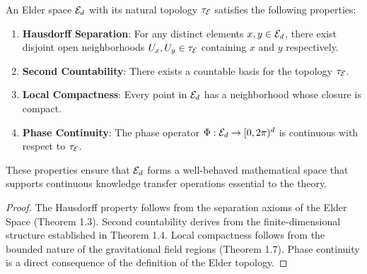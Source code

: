 \begin{theorem}
An Elder space $\mathcal{E}_{d}$ with its natural topology $\tau_{\mathcal{E}_{}}$ satisfies the following properties:
\begin{enumerate}
    \item \textbf{Hausdorff Separation}: For any distinct elements $x, y \in \mathcal{E}_{d}$, there exist disjoint open neighborhoods $U_x, U_y \in \tau_{\mathcal{E}_{}}$ containing $x$ and $y$ respectively.
    
    \item \textbf{Second Countability}: There exists a countable basis for the topology $\tau_{\mathcal{E}_{}}$.
    
    \item \textbf{Local Compactness}: Every point in $\mathcal{E}_{d}$ has a neighborhood whose closure is compact.
    
    \item \textbf{Phase Continuity}: The phase operator $\Phi: \mathcal{E}_{d} \rightarrow [0, 2\pi)^d$ is continuous with respect to $\tau_{\mathcal{E}_{}}$.
\end{enumerate}
These properties ensure that $\mathcal{E}_{d}$ forms a well-behaved mathematical space that supports continuous knowledge transfer operations essential to the theory.
\end{theorem}

\begin{proof}
The Hausdorff property follows from the separation axioms of the Elder Space (Theorem 1.3). Second countability derives from the finite-dimensional structure established in Theorem 1.4. Local compactness follows from the bounded nature of the gravitational field regions (Theorem 1.7). Phase continuity is a direct consequence of the definition of the Elder topology.
\end{proof}

